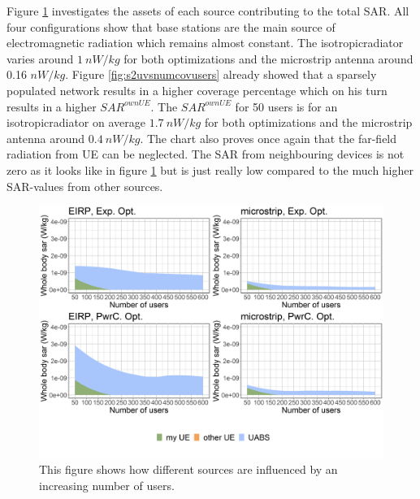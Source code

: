 Figure \ref{fig:s2fourSourcesMatrix} investigates the assets of each source contributing to the total \gls{SAR}. All four 
configurations show that base stations are the main source of electromagnetic radiation which remains almost constant.
The \gls{isotropicradiator} varies around $1\ nW/kg$ for both optimizations and the microstrip antenna around 0.16 $nW/kg$.
Figure \ref{fig:s2uvsnumcovusers} already 
showed that a sparsely populated network results in a higher coverage percentage which on his turn results in a higher $SAR^{ownUE}$. 
The  $SAR^{ownUE}$ for 50 users is for an \gls{isotropicradiator} on average $1.7\ nW/kg$ for both optimizations and the microstrip antenna around $0.4\ nW/kg$.
The chart also proves once again that the far-field radiation from \gls{UE} can be neglected. The \gls{SAR} from 
neighbouring devices is not zero as it looks like in figure \ref{fig:s2fourSourcesMatrix} but is just really low compared to the much higher
\gls{SAR}-values from other sources.
\begin{figure}[h!]
\centering
  \includegraphics[width=\textwidth]{../results/s2/uFourSources.png}
  \caption{This figure shows how different sources are influenced by an increasing number of users. }
  \label{fig:s2fourSourcesMatrix}
\end{figure}

